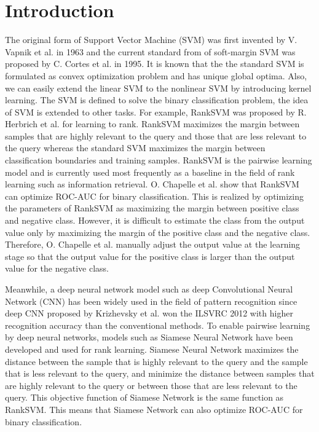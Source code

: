 \documentclass[twocolumn,10pt]{article}
\begin{document}
\section{Introduction}
The original form of Support Vector Machine (SVM) was first invented by V. Vapnik et al. \cite{Vapnik1963} in 1963 and the current standard from of soft-margin SVM was proposed by C. Cortes et al. \cite{SVM1995} in 1995.
It is known that the the standard SVM is formulated as convex optimization problem and has unique global optima.
Also, we can easily extend the linear SVM to the nonlinear SVM by introducing kernel learning.
The SVM is defined to solve the binary classification problem, the idea of SVM is extended to other tasks.
For example, RankSVM was proposed by R. Herbrich et al. \cite{RankSVM} for learning to rank. 
RankSVM maximizes the margin between samples that are highly relevant to the query and those that are less relevant to the query whereas 
the standard SVM maximizes the margin between classification boundaries and training samples.
RankSVM is the pairwise learning model and is currently used most frequently as a baseline in the field of rank learning such as information retrieval.
O. Chapelle et al. \cite{ROCAUC} show that RankSVM can optimize ROC-AUC for binary classification.
This is realized by optimizing the parameters of RankSVM as maximizing the margin between positive class and negative class. 
However, it is difficult to estimate the class from the output value only by maximizing the margin of the positive class and the negative class.
Therefore, O. Chapelle et al. manually adjust the output value at the learning stage so that the output value for the positive class is larger than the output value for the negative class. \par
Meanwhile, a deep neural network model such as deep Convolutional Neural Network (CNN) has been widely used in the field of pattern recognition since deep CNN proposed by Krizhevsky et al. \cite{Krizhevsky2012} won the ILSVRC 2012 with higher recognition accuracy than the conventional methods.
To enable pairwise learning by deep neural networks, 
models such as Siamese Neural Network \cite{Bromely1993,Chopra2005,Hadsell2006} have been developed and used for rank learning.
Siamese Neural Network maximizes the distance between the sample that is highly relevant to the query and the sample that is less relevant to the query, and minimize the distance between samples that are highly relevant to the query or between those that are less relevant to the query.
This objective function of Siamese Network is the same function as RankSVM.
This means that Siamese Network can also optimize ROC-AUC for binary classification.
\thispagestyle{empty}
\end{document}
